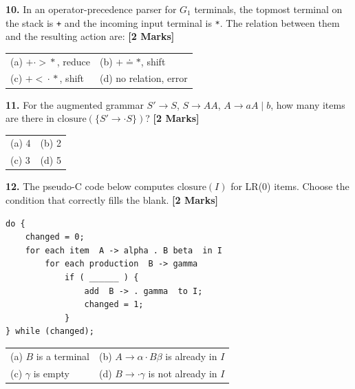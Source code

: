 \documentclass[11pt,a4paper]{article}
\begin{document}
\vspace{0.22cm}

\noindent \textbf{10.} In an operator-precedence parser for $G_1$ terminals, the topmost terminal on the stack is \texttt{+} and the incoming input terminal is \texttt{*}. The relation between them and the resulting action are: \hfill \textbf{[2 Marks]}
\vspace{0.06cm}
\noindent
\begin{tabularx}{\textwidth}{@{}X X@{}}
(a) $+ \mathrel{\cdot\!>} *$, reduce & (b) $+ \doteq *$, shift \\[3pt]
(c) $+ \mathrel{<\!\cdot} *$, shift & (d) no relation, error \\
\end{tabularx}

\vspace{0.22cm}

\noindent \textbf{11.} For the augmented grammar $S' \rightarrow S$, \quad $S \rightarrow AA$, \quad $A \rightarrow aA \mid b$, how many items are there in $\text{closure}(\{S' \rightarrow \cdot S\})$? \hfill \textbf{[2 Marks]}
\vspace{0.06cm}
\noindent
\begin{tabularx}{\textwidth}{@{}X X@{}}
(a) 4 & (b) 2 \\[3pt]
(c) 3 & (d) 5 \\
\end{tabularx}

\vspace{0.22cm}

\noindent \textbf{12.} The pseudo-C code below computes $\text{closure}(I)$ for LR(0) items. Choose the condition that correctly fills the blank. \hfill \textbf{[2 Marks]}
\begin{lstlisting}
do {
    changed = 0;
    for each item  A -> alpha . B beta  in I
        for each production  B -> gamma
            if ( ______ ) {
                add  B -> . gamma  to I;
                changed = 1;
            }
} while (changed);
\end{lstlisting}
\vspace{0.06cm}
\noindent
\begin{tabularx}{\textwidth}{@{}X X@{}}
(a) $B$ is a terminal & (b) $A \rightarrow \alpha \cdot B\beta$ is already in $I$ \\[3pt]
(c) $\gamma$ is empty & (d) $B \rightarrow \cdot\gamma$ is not already in $I$ \\
\end{tabularx}
\end{document}
